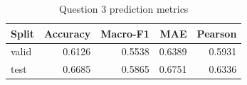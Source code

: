 \begin{table}[htbp]
\centering
\caption{Question 3 prediction metrics}
\label{tab:q3_metrics}
\begin{tabular}{lrrrr}
\toprule
Split & Accuracy & Macro-F1 & MAE & Pearson \\
\midrule
valid & 0.6126 & 0.5538 & 0.6389 & 0.5931 \\
test & 0.6685 & 0.5865 & 0.6751 & 0.6336 \\
\bottomrule
\end{tabular}
\end{table}
